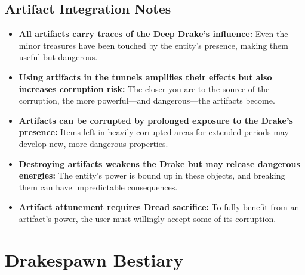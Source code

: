\documentclass[11pt]{article}
\begin{document}
\subsection{Artifact Integration Notes}
\begin{itemize}
\item \textbf{All artifacts carry traces of the Deep Drake's influence:} Even the minor treasures have been touched by the entity's presence, making them useful but dangerous.
\item \textbf{Using artifacts in the tunnels amplifies their effects but also increases corruption risk:} The closer you are to the source of the corruption, the more powerful---and dangerous---the artifacts become.
\item \textbf{Artifacts can be corrupted by prolonged exposure to the Drake's presence:} Items left in heavily corrupted areas for extended periods may develop new, more dangerous properties.
\item \textbf{Destroying artifacts weakens the Drake but may release dangerous energies:} The entity's power is bound up in these objects, and breaking them can have unpredictable consequences.
\item \textbf{Artifact attunement requires Dread sacrifice:} To fully benefit from an artifact's power, the user must willingly accept some of its corruption.
\end{itemize}


\section{Drakespawn Bestiary}
\end{document}
